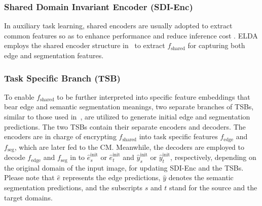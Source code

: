\documentclass{bmvc2k}
\newcommand{\eshatinit}{\hat{e}_s^{\text{init}}}
\newcommand{\ethatinit}{\hat{e}_t^{\text{init}}}
\newcommand{\yshatinit}{\hat{y}_s^{\text{init}}}
\newcommand{\ythatinit}{\hat{y}_t^{\text{init}}}
\newcommand{\fs}{f_{\text{shared}}}
\newcommand{\fy}{f_{\text{seg}}}
\newcommand{\fe}{f_{\text{edge}}}
\begin{document}
\subsubsection{Shared Domain Invariant Encoder (SDI-Enc)}
\label{subsubsec::SDI-Enc}


In auxiliary task learning, shared encoders are
usually adopted to extract common features so as to enhance performance and reduce inference cost \cite{mtinet}. ELDA employs the shared encoder structure in~\cite{wang2021domain} to extract $\fs$
for capturing both edge and segmentation features.






\subsubsection{Task Specific Branch (TSB)}
\label{subsubsec::TSB}

To enable $\fs$ to be further interpreted into specific feature embeddings that bear edge and semantic segmentation meanings, two separate branches of TSBs, similar to those used in~\cite{mtinet, wang2021domain}, are utilized to generate initial edge and segmentation predictions. The two TSBs contain their separate encoders and decoders. The encoders are in charge of encrypting $\fs$ into task specific features $\fe$ and $\fy$, which are later fed to the CM. Meanwhile, the decoders are employed to decode $\fe$ and $\fy$ in to $\eshatinit$ or $\ethatinit$ and $\yshatinit$ or $\ythatinit$, respectively, depending on the original domain of the input image, for updating SDI-Enc and the TSBs. Please note that $\hat{e}$ represents the edge predictions, $\hat{y}$ denotes the semantic segmentation predictions, and the subscripts $s$ and $t$ stand for the source and the target domains. 
\end{document}
